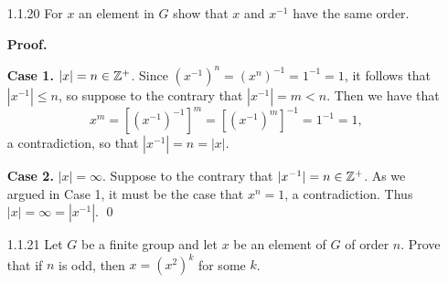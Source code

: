 \begin{enumerate}
\begin{enumerate}
               \textbf{Case 2:} \textit{$a$ and $b$ are negative}. Thus
               \begin{align*}
                  (x^a)^b &= [x^{-(-a)}]^b \\
                          &= [(x^{-1})^{-a}]^b &[\text{Definition}] \\
                          &= (x^{-1})^{-ab} &[\text{Case 1}] \\
                          &= [(x^{-1})^{-1}]^{ab}. &[\text{Definition}] \\
                          &= x^{ab}. &[\text{Proposition 1 (3)}]
               \end{align*}

               \textbf{Case 3:} \textit{$a$ is negative and $b$ is positive}. 
               Thus
               \begin{align*}
                  (x^a)^b &= [x^{-(-a)}]^b \\
                          &= [(x^{-1})^{-a}]^b &[\text{Definition}] \\
                          &= (x^{-1})^{-ab} &[\text{Case 1}] \\
                          &= x^{-(-ab)} &[\text{Definition}] \\
                          &= x^{ab}.
               \end{align*}

               Combining these results with part (a), we can conclude that
               $(x^a)^b = x^{ab}$ holds for all integers $a$ and $b$ and
               $x \in G$. \qed
      \end{enumerate}
   \item[1.1.20]  For $x$ an element in $G$ show that $x$ and $x^{-1}$ have the
                  same order.

      \textbf{Proof.}

      \textbf{Case 1.} \textit{$|x| = n \in \mathbb{Z}^+$}. Since
      $(x^{-1})^n = (x^n)^{-1} = 1^{-1} = 1$, it follows that $|x^{-1}| \le n$,
      so suppose to the contrary that $|x^{-1}| = m < n$. Then we have that
      $$x^m = [(x^{-1})^{-1}]^m = [(x^{-1})^m]^{-1} = 1^{-1} = 1,$$
      a contradiction, so that $|x^{-1}| = n = |x|$.

      \textbf{Case 2.} \textit{$|x| = \infty$}. Suppose to the contrary that
      $|x^{-1}| = n \in \mathbb{Z}^+$. As we argued in Case 1, it must be the case that
      $x^n = 1$, a contradiction. Thus $|x| = \infty = |x^{-1}|$. \qed
   \item[1.1.21]  Let $G$ be a finite group and let $x$ be an element of $G$ of
                  order $n$. Prove that if $n$ is odd, then $x = (x^2)^k$ for
                  some $k$.


\end{enumerate}

